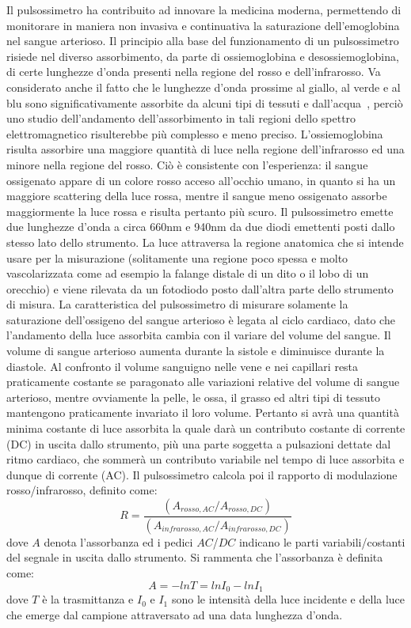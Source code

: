 \documentclass[a4paper, 12pt]{book}
\begin{document}
Il pulsossimetro ha contribuito ad innovare la medicina moderna, permettendo di monitorare in maniera non invasiva e continuativa la saturazione dell'emoglobina nel sangue arterioso.
Il principio alla base del funzionamento di un pulsossimetro risiede nel diverso assorbimento, da parte di ossiemoglobina e desossiemoglobina, di certe lunghezze d'onda presenti nella regione del rosso e dell'infrarosso.
Va considerato anche il fatto che le lunghezze d'onda prossime al giallo, al verde e al blu sono significativamente assorbite da alcuni tipi di tessuti e dall'acqua~\cite{Water}, perciò uno studio dell'andamento dell'assorbimento in tali regioni dello spettro elettromagnetico risulterebbe più complesso e meno preciso.
L'ossiemoglobina risulta assorbire una maggiore quantità di luce nella regione dell'infrarosso ed una minore nella regione del rosso.
Ciò è consistente con l'esperienza: il sangue ossigenato appare di un colore rosso acceso all'occhio umano, in quanto si ha un maggiore scattering della luce rossa, mentre il sangue meno ossigenato assorbe maggiormente la luce rossa e risulta pertanto più scuro.
Il pulsossimetro emette due lunghezze d'onda a circa 660nm e 940nm da due diodi emettenti posti dallo stesso lato dello strumento.
La luce attraversa la regione anatomica che si intende usare per la misurazione (solitamente una regione poco spessa e molto vascolarizzata come ad esempio la falange distale di un dito o il lobo di un orecchio) e viene rilevata da un fotodiodo posto dall'altra parte dello strumento di misura.
La caratteristica del pulsossimetro di misurare solamente la saturazione dell'ossigeno del sangue arterioso è legata al ciclo cardiaco, dato che l'andamento della luce assorbita cambia con il variare del volume del sangue.
Il volume di sangue arterioso aumenta durante la sistole e diminuisce durante la diastole.
Al confronto il volume sanguigno nelle vene e nei capillari resta praticamente costante se paragonato alle variazioni relative del volume di sangue arterioso, mentre ovviamente la pelle, le ossa, il grasso ed altri tipi di tessuto mantengono praticamente invariato il loro volume.
Pertanto si avrà una quantità minima costante di luce assorbita la quale darà un contributo costante di corrente (DC) in uscita dallo strumento, più una parte soggetta a pulsazioni dettate dal ritmo cardiaco, che sommerà un contributo variabile nel tempo di luce assorbita e dunque di corrente (AC).
Il pulsossimetro calcola poi il rapporto di modulazione rosso/infrarosso, definito come:
\begin{equation}
    \label{eq:R}
    R=\frac{(A_{rosso,AC}/A_{rosso,DC})}{(A_{infrarosso,AC}/A_{infrarosso,DC})}
\end{equation}
dove $A$ denota l'assorbanza ed i pedici $AC$/$DC$ indicano le parti variabili/costanti del segnale in uscita dallo strumento.
Si rammenta che l'assorbanza è definita come:
\begin{equation}
    \label{eq:Absorbance}
    A = -ln T = ln I_{0} - ln I_{1}
\end{equation}
dove $T$ è la trasmittanza e $I_{0}$ e $I_{1}$ sono le intensità della luce incidente e della luce che emerge dal campione attraversato ad una data lunghezza d'onda.
\newline
\end{document}
